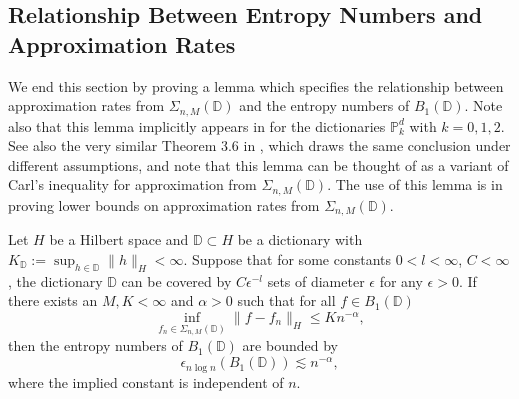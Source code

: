 \subsection{Relationship Between Entropy Numbers and Approximation Rates}\label{entropy-lemma-section}
We end this section by proving a lemma which specifies the relationship between approximation rates from $\Sigma_{n,M}(\mathbb{D})$ and the entropy numbers of $B_1(\mathbb{D})$. Note also that this lemma implicitly appears in \cite{makovoz1996random,klusowski2018approximation} for the dictionaries $\mathbb{P}^d_k$ with $k=0,1,2$. See also the very similar Theorem 3.6 in \cite{cohen2020optimal}, which draws the same conclusion under different assumptions, and note that this lemma can be thought of as a variant of Carl's inequality for approximation from $\Sigma_{n,M}(\mathbb{D})$. The use of this lemma is in proving lower bounds on approximation rates from $\Sigma_{n,M}(\mathbb{D})$.
\begin{lemma}\label{entropy-lemma}
 Let $H$ be a Hilbert space and $\mathbb{D}\subset H$ be a dictionary with $K_\mathbb{D}:=\sup_{h\in \mathbb{D}} \|h\|_H < \infty$. Suppose that for some constants $0 < l < \infty$, $C < \infty$, the dictionary $\mathbb{D}$ can be covered by $C\epsilon^{-l}$ sets of diameter $\epsilon$ for any $\epsilon > 0$. If there exists an $M,K < \infty$ and $\alpha > 0$ such that for all $f\in B_1(\mathbb{D})$
 \begin{equation}\label{approx-bound-estimate}
  \inf_{f_n\in \Sigma_{n,M}(\mathbb{D})} \|f - f_n\|_H \leq Kn^{-\alpha},
 \end{equation}
 then the entropy numbers of $B_1(\mathbb{D})$ are bounded by
 \begin{equation}
  \epsilon_{n\log{n}}(B_1(\mathbb{D})) \lesssim n^{-\alpha},
 \end{equation}
 where the implied constant is independent of $n$.
\end{lemma}
